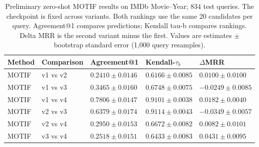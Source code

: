 \begin{table}[htbp]
\centering
\small
\renewcommand{\arraystretch}{1.15}
\setlength{\tabcolsep}{5pt}
\begin{adjustbox}{max width=\linewidth}
\begin{tabular}{|l|l|l|l|l|}
\hline
\textbf{Method} & \textbf{Comparison} & \textbf{Agreement@1} & \textbf{Kendall-$\tau_b$} & \textbf{$\Delta$MRR} \\
\hline
MOTIF & v1 vs v2 & $0.2410 \pm 0.0146$ & $0.6166 \pm 0.0085$ & $0.0100 \pm 0.0100$ \\
\hline
MOTIF & v1 vs v3 & $0.3465 \pm 0.0160$ & $0.6748 \pm 0.0075$ & $-0.0249 \pm 0.0085$ \\
\hline
MOTIF & v1 vs v4 & $0.7806 \pm 0.0147$ & $0.9101 \pm 0.0038$ & $0.0182 \pm 0.0040$ \\
\hline
MOTIF & v2 vs v3 & $0.6379 \pm 0.0174$ & $0.9114 \pm 0.0043$ & $-0.0349 \pm 0.0057$ \\
\hline
MOTIF & v2 vs v4 & $0.2950 \pm 0.0153$ & $0.6672 \pm 0.0082$ & $0.0082 \pm 0.0101$ \\
\hline
MOTIF & v3 vs v4 & $0.2518 \pm 0.0151$ & $0.6433 \pm 0.0083$ & $0.0431 \pm 0.0095$ \\
\hline
\end{tabular}
\end{adjustbox}
\caption{Preliminary zero-shot MOTIF results on IMDb Movie--Year; 834 test queries. The checkpoint is fixed across variants. Both rankings use the same 20 candidates per query. Agreement@1 compares predictions; Kendall tau-b compares rankings. Delta MRR is the second variant minus the first. Values are estimates $\pm$ bootstrap standard error (1,000 query resamples).}
\label{tab:motif-imdb-movie-year-invariance}
\end{table}
